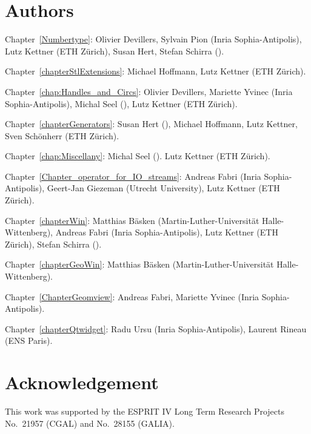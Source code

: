 \section*{Authors}

Chapter~\ref{Numbertype}: 
Olivier Devillers, Sylvain Pion ({\sc Inria} Sophia-Antipolis),
Lutz Kettner (ETH Z\"urich),
Susan Hert, Stefan Schirra ().

Chapter~\ref{chapterStlExtensions}: 
Michael Hoffmann, Lutz Kettner (ETH Z\"urich).

Chapter~\ref{chap:Handles_and_Circs}:
Olivier Devillers, Mariette Yvinec ({\sc Inria} Sophia-Antipolis),
Michal Seel (),
Lutz Kettner (ETH Z\"urich).

Chapter~\ref{chapterGenerators}: 
Susan Hert (),
Michael Hoffmann, Lutz Kettner, Sven Sch\"onherr (ETH Z\"urich).

Chapter~\ref{chap:Miscellany}:
Michal Seel ().
Lutz Kettner (ETH Z\"urich).

Chapter~\ref{Chapter_operator_for_IO_streams}: 
Andreas Fabri ({\sc Inria} Sophia-Antipolis),
Geert-Jan Giezeman (Utrecht University),
Lutz Kettner (ETH Z\"urich).

Chapter~\ref{chapterWin}:
Matthias B\"asken (Martin-Luther-Universit{\"a}t Halle-Wittenberg),
Andreas Fabri ({\sc Inria} Sophia-Antipolis),
Lutz Kettner (ETH Z\"urich),
Stefan Schirra ().

Chapter~\ref{chapterGeoWin}:
Matthias B\"asken (Martin-Luther-Universit{\"a}t Halle-Wittenberg).

Chapter~\ref{ChapterGeomview}:
Andreas Fabri, Mariette Yvinec ({\sc Inria} Sophia-Antipolis).

Chapter~\ref{chapterQtwidget}:
Radu Ursu ({\sc Inria} Sophia-Antipolis),
Laurent Rineau (ENS Paris).

\section*{Acknowledgement}

This work was supported
by the ESPRIT IV Long Term Research Projects No.~21957 (CGAL)
and No.~28155 (GALIA).


